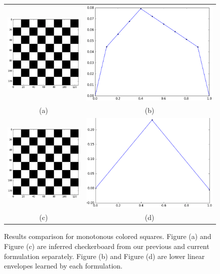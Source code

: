 \begin{figure}[ht]
  \centering
  \setlength{\tabcolsep}{2pt}
  \begin{tabular}{cc}
    \includegraphics[width=0.3\columnwidth]{Part2/figures/mono_gt.png}&
                                                                              \includegraphics[width=0.4\columnwidth]{Part2/figures/mono_old.png}\\
    {\small (a)} & {\small (b)} \\
    \includegraphics[width=0.3\columnwidth]{Part2/figures/mono_gt.png}&
                                                                              \includegraphics[width=0.4\columnwidth]{Part2/figures/mono_new.png}\\
    {\small (c)} & {\small (d)} 
  \end{tabular}
  \caption{\label{fig:mono_results} Results comparison for
    monotonous colored squares. Figure (a) and Figure (c) are
    inferred checkerboard from our previous and current
    formulation separately. Figure (b) and Figure (d) are lower
    linear envelopes learned by each formulation.}
\end{figure}

